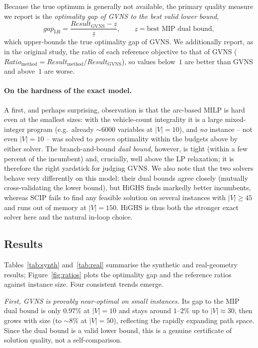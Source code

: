 Because the true optimum is generally not available, the primary quality
measure we report is the \emph{optimality gap of GVNS to the best valid lower
bound},
\[
  gap_{\mathrm{LB}}=\frac{Result_{\text{GVNS}}-\underline{z}}{\underline{z}},
  \qquad
  \underline{z}=\text{best MIP dual bound},
\]
which upper-bounds the true optimality gap of GVNS. We additionally report, as
in the original study, the ratio of each reference objective to that of GVNS
($Ratio_{\text{method}}=Result_{\text{method}}/Result_{\text{GVNS}}$), so values
below~$1$ are better than GVNS and above~$1$ are worse.

\paragraph{On the hardness of the exact model.} A first, and perhaps
surprising, observation is that the arc-based MILP is hard even at the smallest
sizes: with the vehicle-count integrality it is a large mixed-integer program
(e.g.\ already $\sim\!6000$ variables at $|V|=10$), and \emph{no} instance --
not even $|V|=10$ -- was solved to \emph{proven} optimality within the budgets
above by either solver. The branch-and-bound \emph{dual bound}, however, is
tight (within a few percent of the incumbent) and, crucially, well above the LP
relaxation; it is therefore the right yardstick for judging GVNS. We also note
that the two solvers behave very differently on this model: their dual bounds
agree closely (mutually cross-validating the lower bound), but HiGHS finds
markedly better incumbents, whereas SCIP fails to find any feasible solution on
several instances with $|V|\!\ge\!45$ and runs out of memory at $|V|=150$. HiGHS
is thus both the stronger exact solver here and the natural in-loop choice.

\subsection{Results}
Tables~\ref{tab:synth} and~\ref{tab:real} summarise the synthetic and
real-geometry results; Figure~\ref{fig:ratios} plots the optimality gap and the
reference ratios against instance size. Four consistent trends emerge.

\emph{First, GVNS is provably near-optimal on small instances.} Its gap to the
MIP dual bound is only $0.97\%$ at $|V|=10$ and stays around $1$--$2\%$ up to
$|V|\approx30$, then grows with size (to $\sim\!8\%$ at $|V|=50$), reflecting the
rapidly expanding path space. Since the dual bound is a valid lower bound, this
is a genuine certificate of solution quality, not a self-comparison.

